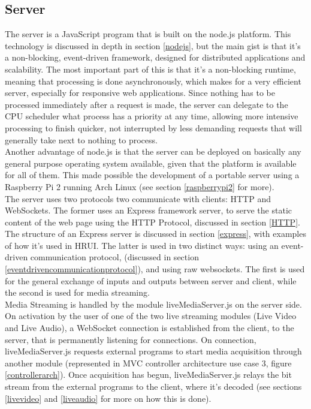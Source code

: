 \subsection{Server}
The server is a JavaScript program that is built on the node.js platform. This technology is discussed in depth in section 
\ref{nodejs}, but the main gist is that it's a non-blocking, event-driven framework, designed for distributed applications and 
scalability. The most important part of this is that it's a non-blocking runtime, meaning that processing is done 
asynchronously, which makes for a very efficient server, especially for responsive web applications. Since nothing has to be 
processed immediately after a request is made, the server can delegate to the CPU scheduler what process has a priority at any 
time, allowing more intensive processing to finish quicker, not interrupted by less demanding requests that will generally 
take next to nothing to process.\\ 

Another advantage of node.js is that the server can be deployed on basically any general purpose operating system available, 
given that the platform is available for all of them. This made possible the development of a portable server using a 
Raspberry Pi 2 running Arch Linux (see section \ref{raspberrypi2} for more).\\

The server uses two protocols two communicate with clients: HTTP and WebSockets. The former uses an Express framework server, 
to serve the static content of the web page using the HTTP Protocol, discussed in section \ref{HTTP}. The structure of an 
Express server is discussed in section \ref{express}, with examples of how it's used in HRUI. The latter is used in two 
distinct ways: using an event-driven communication protocol, (discussed in section \ref{eventdrivencommunicationprotocol}), 
and using raw websockets. The first is used for the general exchange of inputs and outputs between server and client, while 
the second is used for media streaming.\\

Media Streaming is handled by the module liveMediaServer.js on the server side. On activation by the user of one of the two 
live streaming modules (Live Video and Live Audio), a WebSocket connection is established from the client, to the server, that 
is permanently listening for connections. On connection, liveMediaServer.js requests external programs to start media 
acquisition through another module (represented in MVC controller architecture use case 3, figure \ref{controllerarch}). Once 
acquisition has begun, liveMediaServer.js relays the bit stream from the external programs to the client, where it's decoded 
(see sections \ref{livevideo} and \ref{liveaudio} for more on how this is done).
